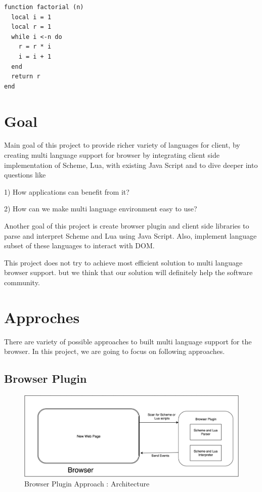 \begin{lstlisting}[frame=single]  
function factorial (n)
  local i = 1
  local r = 1
  while i <-n do 
    r = r * i
    i = i + 1
  end
  return r
end
\end{lstlisting}

\section{Goal}


Main goal of this project to provide richer variety of languages for client, by creating multi language support for browser by integrating client side implementation of Scheme, Lua, with existing Java Script and to dive deeper into questions like 

1) How applications can benefit from it?

2) How can we make multi language environment easy to use?

Another goal of this project is create browser plugin and client side libraries to parse and interpret Scheme and Lua using Java Script. Also, implement language subset of these languages to interact with DOM.


This project does not try to achieve most efficient solution to multi language browser support. but we think that our solution will definitely help the software community.


\section{Approches}

There are variety of possible approaches to built multi language support for the browser. In this project, we are going to focus on following approaches. 

\subsection{Browser Plugin } 


\begin{figure}[ht]
	\begin{center}
		\includegraphics[width=\linewidth]{./images/browserPluginApproach.png}
	\end{center}
	\caption{Browser Plugin Approach : Architecture}
	\label{fig:pluginarchitecture}
\end{figure}

